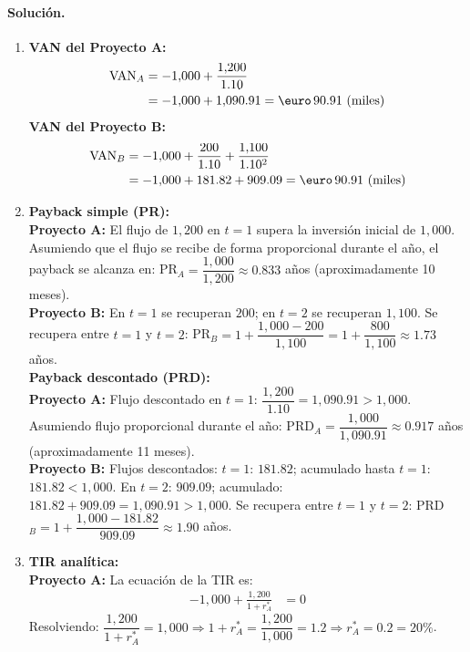 \documentclass[12pt,a4paper]{article}
\newenvironment{solucion}{\paragraph{Solución.}}{}
\begin{document}
\begin{solucion}
\begin{enumerate}[label=\alph*)]
  \item \textbf{VAN del Proyecto A:}
        \begin{align*}
        \text{VAN}_A&=-1{,}000+\frac{1{,}200}{1.10}\\
        &=-1{,}000+1{,}090.91=\text{\euro}\,90.91\text{ (miles)}
        \end{align*}
        \textbf{VAN del Proyecto B:}
        \begin{align*}
        \text{VAN}_B&=-1{,}000+\frac{200}{1.10}+\frac{1{,}100}{1.10^2}\\
        &=-1{,}000+181.82+909.09=\text{\euro}\,90.91\text{ (miles)}
        \end{align*}
  \item \textbf{Payback simple (PR):}\\
        \textbf{Proyecto A:} El flujo de $1{,}200$ en $t=1$ supera la inversión inicial de $1{,}000$. Asumiendo que el flujo se recibe de forma proporcional durante el año, el payback se alcanza en: PR$_A=\dfrac{1{,}000}{1{,}200}\approx0.833$ años (aproximadamente 10 meses).\\
        \textbf{Proyecto B:} En $t=1$ se recuperan $200$; en $t=2$ se recuperan $1{,}100$. Se recupera entre $t=1$ y $t=2$: PR$_B=1+\dfrac{1{,}000-200}{1{,}100}=1+\dfrac{800}{1{,}100}\approx1.73$ años.\\
        \textbf{Payback descontado (PRD):}\\
        \textbf{Proyecto A:} Flujo descontado en $t=1$: $\dfrac{1{,}200}{1.10}=1{,}090.91>1{,}000$. Asumiendo flujo proporcional durante el año: PRD$_A=\dfrac{1{,}000}{1{,}090.91}\approx0.917$ años (aproximadamente 11 meses).\\
        \textbf{Proyecto B:} Flujos descontados: $t=1$: $181.82$; acumulado hasta $t=1$: $181.82<1{,}000$. En $t=2$: $909.09$; acumulado: $181.82+909.09=1{,}090.91>1{,}000$. Se recupera entre $t=1$ y $t=2$: PRD$_B=1+\dfrac{1{,}000-181.82}{909.09}\approx1.90$ años.
  \item \textbf{TIR analítica:}\\
        \textbf{Proyecto A:} La ecuación de la TIR es:
        \begin{align*}
        -1{,}000+\frac{1{,}200}{1+r^*_A}&=0
        \end{align*}
        Resolviendo: $\dfrac{1{,}200}{1+r^*_A}=1{,}000 \Rightarrow 1+r^*_A=\dfrac{1{,}200}{1{,}000}=1.2 \Rightarrow r^*_A=0.2=20\%$.
        

\end{enumerate}
\end{solucion}
\end{document}

